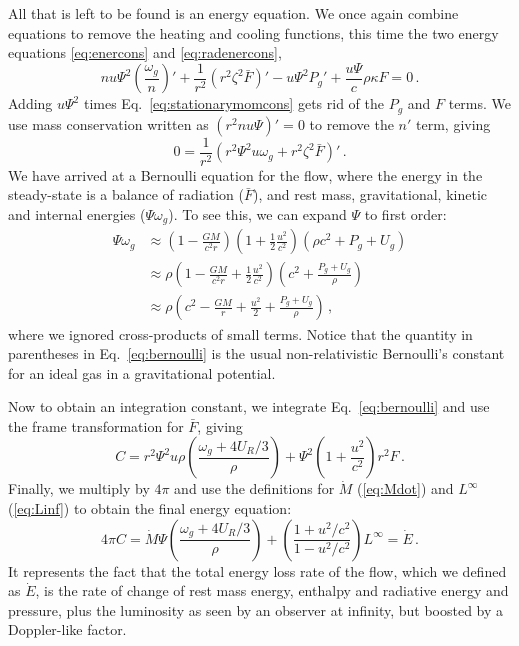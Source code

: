 \documentclass[../main.tex]{subfiles}
\begin{document}
All that is left to be found is an energy equation. We once again combine equations to remove the heating and cooling functions, this time the two energy equations \eqref{eq:enercons} and \eqref{eq:radenercons}, 
\begin{equation}
    n u\Psi^2\left(\frac{\omega_g}{n}\right)'+\frac{1}{r^2}\left(r^2\zeta^2\bar{F}\right)'-u\Psi^2P_g'+\frac{u\Psi}{c}\rho\kappa F=0\,.
\end{equation}
Adding $u\Psi^2$ times Eq.~\eqref{eq:stationarymomcons} gets rid of the $P_g$ and $F$ terms. We use mass conservation written as $(r^2nu\Psi)'=0$ to remove the $n'$ term, giving
\begin{equation}\label{eq:bernoulli}
    0=\frac{1}{r^2}\left(r^2\Psi^2u\omega_g+r^2\zeta^2\bar{F}\right)'\,.
\end{equation}
We have arrived at a Bernoulli equation for the flow, where the energy in the steady-state is a balance of radiation ($\bar{F}$), and rest mass, gravitational, kinetic and internal energies ($\Psi\omega_g$). To see this, we can expand $\Psi$ to first order:
\begin{align}
    \Psi\omega_g &\approx \left(1-\frac{GM}{c^2 r}\right)\left(1+\frac{1}{2}\frac{u^2}{c^2}\right)(\rho c^2+P_g+U_g)\nonumber\\
    &\approx \rho\left(1-\frac{GM}{c^2r}+\frac{1}{2}\frac{u^2}{c^2}\right)\left(c^2+\frac{P_g+U_g}{\rho}\right)\nonumber\\
    &\approx \rho\left(c^2-\frac{GM}{r}+\frac{u^2}{2}+\frac{P_g+U_g}{\rho}\right)\,,\label{eq:bernoulli_approx}
\end{align}
where we ignored cross-products of small terms. Notice that the quantity in parentheses in Eq.~\eqref{eq:bernoulli} is the usual non-relativistic Bernoulli's constant for an ideal gas in a gravitational potential.

Now to obtain an integration constant, we integrate Eq.~\eqref{eq:bernoulli} and use the frame transformation for $\bar{F}$, giving
\begin{equation}
    C=r^2\Psi^2u\rho\left(\frac{\omega_g+4U_R/3}{\rho}\right)+\Psi^2\left(1+\frac{u^2}{c^2}\right)r^2F\,.
\end{equation}
Finally, we multiply by $4\pi$ and use the definitions for $\dot{M}$ (\ref{eq:Mdot}) and $L^\infty$ (\ref{eq:Linf}) to obtain the final energy equation:
\begin{equation}\label{eq:Edot}
    4\pi C=\boxed{\dot{M}\Psi\left(\frac{\omega_g+4U_R/3}{\rho}\right)+\left(\frac{1+u^2/c^2}{1-u^2/c^2}\right)L^\infty=\dot{E}} \,.
\end{equation}
It represents the fact that the total energy loss rate of the flow, which we defined as $\dot{E}$, is the rate of change of rest mass energy, enthalpy and radiative energy and pressure, plus the luminosity as seen by an observer at infinity, but boosted by a Doppler-like factor. 
\end{document}
